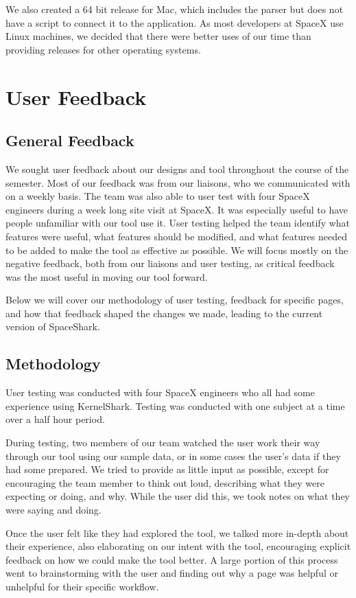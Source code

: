 \documentclass{hmcclinic}
\begin{document}
  We also created a 64 bit release for Mac, which includes the parser but does
  not have a script to connect it to the application. As most developers at
  SpaceX use Linux machines, we decided that there were better uses of our time
  than providing releases for other operating systems.


\chapter{User Feedback} %
\section{General Feedback} %
We sought user feedback about our designs and tool throughout the course of the
semester. Most of our feedback was from our liaisons, who we communicated with
on a weekly basis. The team was also able to user test with four SpaceX
engineers during a week long site visit at SpaceX. It was especially useful to
have people unfamiliar with our tool use it.  User testing helped the team
identify what features were useful, what features should be modified, and what
features needed to be added to make the tool as effective as possible.  We will
focus mostly on the negative feedback, both from our liaisons and user testing,
as critical feedback was the most useful in moving our tool forward.

Below we will cover our methodology of user testing, feedback for specific
pages, and how that feedback shaped the changes we made, leading to the current
version of SpaceShark.

\section{Methodology} %
User testing was conducted with four SpaceX engineers who all had some
experience using KernelShark. Testing was conducted with one subject
at a time over a half hour period.

During testing, two members of our team watched the user work their way through
our tool using our sample data, or in some cases the user's data if they had
some prepared. We tried to provide as little input as possible, except for
encouraging the team member to think out loud, describing what they were
expecting or doing, and why. While the user did this, we took notes on what they
were saying and doing.

Once the user felt like they had explored the tool, we talked more in-depth
about their experience, also elaborating on our intent with the tool,
encouraging explicit feedback on how we could make the tool better. A large
portion of this process went to brainstorming with the user and finding out why
a page was helpful or unhelpful for their specific workflow.
\end{document}
